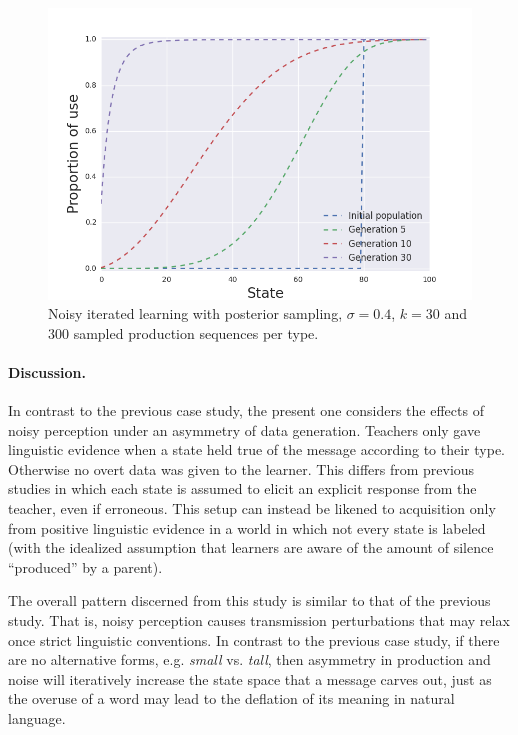 \documentclass[10pt,a4paper]{article}
\begin{document}
\begin{figure}[ht]
\centering
    \includegraphics[scale=0.45]{../code/plots/deflation-sigma04.png}
  \caption{Noisy iterated learning with posterior sampling, $\sigma = 0.4$, $k = 30$ and $300$ sampled production sequences per type.}
  \label{fig:defl}
\end{figure}

\paragraph{Discussion.} In contrast to the previous case study, the present one considers the effects of noisy perception under an asymmetry of data generation. Teachers only gave linguistic evidence when a state held true of the message according to their type. Otherwise no overt data was given to the learner. This differs from previous studies in which each state is assumed to elicit an explicit response from the teacher, even if erroneous. This setup can instead be likened to acquisition only from positive linguistic evidence in a world in which not every state is labeled (with the idealized assumption that learners are aware of the amount of silence ``produced'' by a parent). 

The overall pattern discerned from this study is similar to that of the previous study. That is, noisy perception causes transmission perturbations that may relax once strict linguistic conventions. In contrast to the previous case study, if there are no alternative forms, e.g. {\em small} vs. {\em tall}, then asymmetry in production and noise will iteratively increase the state space that a message carves out, just as the overuse of a word may lead to the deflation of its meaning in natural language.
\end{document}
